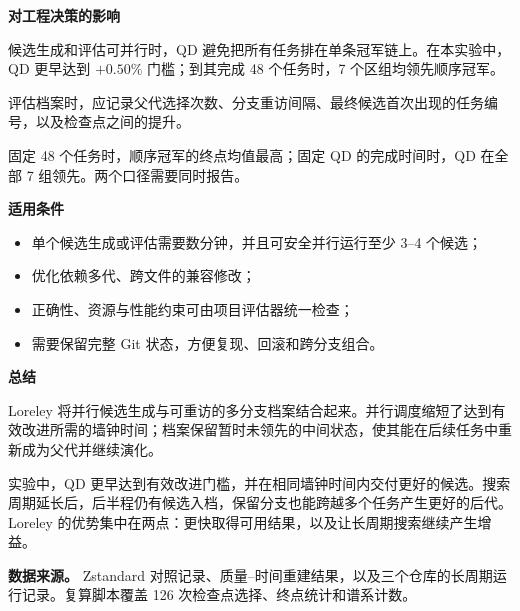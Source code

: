 \documentclass[UTF8,fontset=none,a4paper]{ctexart}
\newcommand{\decisionbox}[3]{%
  \begin{minipage}[t]{0.315\textwidth}
    \colorbox{#1}{\parbox{\dimexpr\linewidth-2\fboxsep\relax}{%
      \vspace{3pt}{\bfseries #2}\par\small #3\vspace{3pt}}}
  \end{minipage}%
}
\begin{document}
\vspace{7pt}
{\color{ink}\large\bfseries 对工程决策的影响}\par
\vspace{3pt}
\decisionbox{bluepale}{1. 同时报告达标时间}{候选生成和评估可并行时，QD 避免把所有任务排在单条冠军链上。在本实验中，QD 更早达到 $+0.50\%$ 门槛；到其完成 48 个任务时，7 个区组均领先顺序冠军。}\hfill
\decisionbox{greenpale}{2. 记录分支重访}{评估档案时，应记录父代选择次数、分支重访间隔、最终候选首次出现的任务编号，以及检查点之间的提升。}\hfill
\decisionbox{orangepale}{3. 分别比较任务数与时间}{固定 48 个任务时，顺序冠军的终点均值最高；固定 QD 的完成时间时，QD 在全部 7 组领先。两个口径需要同时报告。}

\vspace{7pt}
\begin{minipage}[t]{0.485\textwidth}
{\color{ink}\large\bfseries 适用条件}\par
\small
\begin{itemize}
  \item 单个候选生成或评估需要数分钟，并且可安全并行运行至少 3--4 个候选；
  \item 优化依赖多代、跨文件的兼容修改；
  \item 正确性、资源与性能约束可由项目评估器统一检查；
  \item 需要保留完整 Git 状态，方便复现、回滚和跨分支组合。
\end{itemize}
\end{minipage}\hfill
\begin{minipage}[t]{0.485\textwidth}
{\color{ink}\large\bfseries 总结}\par
\small
Loreley 将并行候选生成与可重访的多分支档案结合起来。并行调度缩短了达到有效改进所需的墙钟时间；档案保留暂时未领先的中间状态，使其能在后续任务中重新成为父代并继续演化。\par
实验中，QD 更早达到有效改进门槛，并在相同墙钟时间内交付更好的候选。搜索周期延长后，后半程仍有候选入档，保留分支也能跨越多个任务产生更好的后代。Loreley 的优势集中在两点：更快取得可用结果，以及让长周期搜索继续产生增益。
\end{minipage}

\vspace{6pt}
\colorbox{surface}{\parbox{\dimexpr\textwidth-2\fboxsep\relax}{%
\scriptsize\textbf{数据来源。}
Zstandard 对照记录、质量--时间重建结果，以及三个仓库的长周期运行记录。复算脚本覆盖 126 次检查点选择、终点统计和谱系计数。}}

\vspace{3pt}
{\footnotesize
\setlength{\bibsep}{0pt}

}
\end{document}
